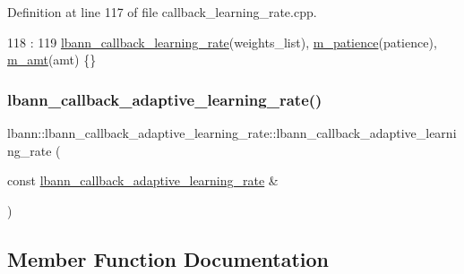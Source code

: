 Definition at line 117 of file callback\+\_\+learning\+\_\+rate.\+cpp.


\begin{DoxyCode}
118                                                                          :
119   \hyperlink{classlbann_1_1lbann__callback__learning__rate_a69687cd55f4d09c480e08e18488519fe}{lbann\_callback\_learning\_rate}(weights\_list), 
      \hyperlink{classlbann_1_1lbann__callback__adaptive__learning__rate_ac3ac3c4d34d62608c54dfa3a41691217}{m\_patience}(patience), \hyperlink{classlbann_1_1lbann__callback__adaptive__learning__rate_ab9c76371184664ccd8e240e3b16a9736}{m\_amt}(amt) \{\}
\end{DoxyCode}
\mbox{\label{classlbann_1_1lbann__callback__adaptive__learning__rate_a0b2fd5ecb8eb767184951947ced9b9b7}} 
\subsubsection{\texorpdfstring{lbann\+\_\+callback\+\_\+adaptive\+\_\+learning\+\_\+rate()}{lbann\_callback\_adaptive\_learning\_rate()}\hspace{0.1cm}{\footnotesize\ttfamily [3/3]}}
{\footnotesize\ttfamily lbann\+::lbann\+\_\+callback\+\_\+adaptive\+\_\+learning\+\_\+rate\+::lbann\+\_\+callback\+\_\+adaptive\+\_\+learning\+\_\+rate (\begin{DoxyParamCaption}\item[{const \hyperlink{classlbann_1_1lbann__callback__adaptive__learning__rate}{lbann\+\_\+callback\+\_\+adaptive\+\_\+learning\+\_\+rate} \&}]{ }\end{DoxyParamCaption})\hspace{0.3cm}{\ttfamily [default]}}



\subsection{Member Function Documentation}
\mbox{\label{classlbann_1_1lbann__callback__adaptive__learning__rate_ad5f290b78276fc9c7fd54a67c4a7e6eb}} 
